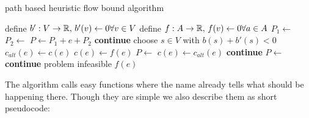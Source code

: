 \begin{algorithm}
 \caption{path based heuristic flow bound algorithm}
\label{algo:pathHeur}
 \begin{algorithmic}[0]%
    \State define $b':V\to \mathbb{R},\, b'(v)\gets 0 \forall v\in V$
    \State define $f: A\to\mathbb{R},\, f(v)\gets 0 \forall a\in A$
	\State $P_1\gets $
	\State $P_2\gets $
	  \State $P\gets P_1+e+P_2$
	  \State {}\label{heur:lineAugCase1}
	  \State \textbf{continue}
	\EndIf
      \EndIf
	\State choose $s\in V$ with $b(s)+b'(s)<0$
	\State $c_{alt}(e)\gets c(e)$
	\State $c(e)\gets f(e)$
	\State $P\gets$
	\State $c(e)\gets c_{alt}(e)$
	  \State {}\label{heur:lineAugCase2}
	  \State \textbf{continue}
	\Else
	  \State $P\gets$ 
	    \State {}\label{heur:lineAugCase3}
	    \State \textbf{continue}
	  \Else
	    \State \Return problem infeasible
	  \EndIf
	\EndIf
    \EndWhile
    \State \Return $f(e)$
  \EndFunction
 \end{algorithmic}

\end{algorithm}%
The algorithm calls easy functions where the name already tells what should be happening there. Though they are simple 
we also describe them as short pseudocode:

